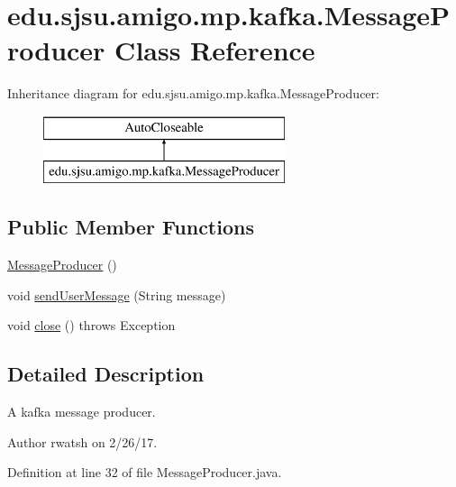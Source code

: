 \hypertarget{classedu_1_1sjsu_1_1amigo_1_1mp_1_1kafka_1_1_message_producer}{}\section{edu.\+sjsu.\+amigo.\+mp.\+kafka.\+Message\+Producer Class Reference}
\label{classedu_1_1sjsu_1_1amigo_1_1mp_1_1kafka_1_1_message_producer}
Inheritance diagram for edu.\+sjsu.\+amigo.\+mp.\+kafka.\+Message\+Producer\+:\begin{figure}[H]
\begin{center}
\leavevmode
\includegraphics[height=2.000000cm]{classedu_1_1sjsu_1_1amigo_1_1mp_1_1kafka_1_1_message_producer}
\end{center}
\end{figure}
\subsection*{Public Member Functions}
\begin{DoxyCompactItemize}
\item 
\hyperlink{classedu_1_1sjsu_1_1amigo_1_1mp_1_1kafka_1_1_message_producer_a5f5a7b1fcfefb3ad629e9ef4a6431f6e}{Message\+Producer} ()
\item 
void \hyperlink{classedu_1_1sjsu_1_1amigo_1_1mp_1_1kafka_1_1_message_producer_a2adcbe52df5a05cfd7d96a09756de9de}{send\+User\+Message} (String message)
\item 
void \hyperlink{classedu_1_1sjsu_1_1amigo_1_1mp_1_1kafka_1_1_message_producer_a0927f16496c80552219dc7abc01ae07c}{close} ()  throws Exception 
\end{DoxyCompactItemize}


\subsection{Detailed Description}
A kafka message producer.

\begin{DoxyAuthor}{Author}
rwatsh on 2/26/17. 
\end{DoxyAuthor}


Definition at line 32 of file Message\+Producer.\+java.



